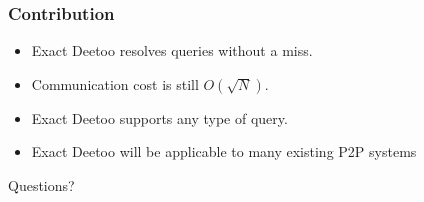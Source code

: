 \documentclass[red]{beamer}
\begin{document}
\begin{frame}
\frametitle{Contribution}
\begin{itemize}
\item Exact Deetoo resolves queries without a miss.
\item Communication cost is still $O(\sqrt{N})$.
\item Exact Deetoo supports any type of query.
\item Exact Deetoo will be applicable to many existing P2P systems
\end{itemize}
\end{frame}

\begin{frame}
\begin{center}
\centering                        \huge Questions?
\end{center}
\end{frame}

 
\end{document}
